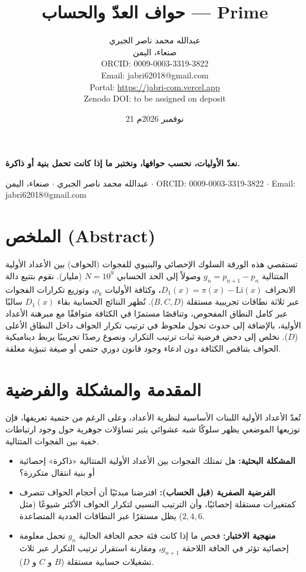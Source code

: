 \documentclass[12pt,a4paper]{article}
\title{\textbf{حواف العدّ والحساب — \textenglish{Prime}}}
\author{عبدالله محمد ناصر الجبري \\
صنعاء، اليمن \\
\textenglish{ORCID: 0009-0003-3319-3822} \\
\textenglish{Email: jabri62018@gmail.com} \\
\textenglish{Portal: \url{https://jabri-com.vercel.app}} \\
\textenglish{Zenodo DOI: to be assigned on deposit}}
\date{21 نوفمبر 2026م}
\begin{document}
\maketitle
\thispagestyle{firstpage}

\begin{center}
\textbf{نعدّ الأوليات، نحسب حوافها، ونختبر ما إذا كانت تحمل بنية أو ذاكرة.}
\end{center}

\begin{center}
\small عبدالله محمد ناصر الجبري \quad $\cdot$ \quad صنعاء، اليمن \quad $\cdot$ \quad \textenglish{ORCID: 0009-0003-3319-3822} \quad $\cdot$ \quad \textenglish{Email: jabri62018@gmail.com}
\end{center}

\vspace{0.5cm}

\section{الملخص (\textenglish{Abstract})}
تستقصي هذه الورقة السلوك الإحصائي والبنيوي للفجوات (الحواف) بين الأعداد الأولية المتتالية $g_n = p_{n+1} - p_n$ وصولاً إلى الحد الحسابي $N = 10^9$ (مليار). نقوم بتتبع دالة الانحراف $D_1(x) = \pi(x) - \mathrm{Li}(x)$، وكثافة الأوليات $\rho_k$، وتوزيع تكرارات الفجوات عبر ثلاثة نطاقات تجريبية مستقلة ($B, C, D$). تُظهر النتائج الحسابية بقاء $D_1(x)$ سالبًا عبر كامل النطاق المفحوص، وتناقصًا مستمرًا في الكثافة متوافقًا مع مبرهنة الأعداد الأولية، بالإضافة إلى حدوث تحول ملحوظ في ترتيب تكرار الحواف داخل النطاق الأعلى ($D$). نخلص إلى دحض فرضية ثبات ترتيب التكرار، ونصوغ رصدًا تجريبيًا يربط ديناميكية الحواف بتناقص الكثافة دون ادعاء وجود قانون دوري حتمي أو صيغة تنبؤية مغلقة.

\section{المقدمة والمشكلة والفرضية}
تُعدّ الأعداد الأولية اللبنات الأساسية لنظرية الأعداد، وعلى الرغم من حتمية تعريفها، فإن توزيعها الموضعي يظهر سلوكًا شبه عشوائي يثير تساؤلات جوهرية حول وجود ارتباطات خفية بين الفجوات المتتالية.

\begin{itemize}
    \item \textbf{المشكلة البحثية:} هل تمتلك الفجوات بين الأعداد الأولية المتتالية «ذاكرة» إحصائية أو بنية انتقال متكررة؟
    \item \textbf{الفرضية الصفرية (قبل الحساب):} افترضنا مبدئيًا أن أحجام الحواف تتصرف كمتغيرات مستقلة إحصائيًا، وأن الترتيب النسبي لتكرار الحواف الأكثر شيوعًا (مثل $2, 4, 6$) يظل مستقرًا عبر النطاقات العددية المتصاعدة.
    \item \textbf{منهجية الاختبار:} فحص ما إذا كانت فئة حجم الحافة الحالية $g_n$ تحمل معلومة إحصائية تؤثر في الحافة اللاحقة $g_{n+1}$، ومقارنة استقرار ترتيب التكرار عبر ثلاث تشغيلات حسابية مستقلة ($B$ و $C$ و $D$).
\end{itemize}
\end{document}
